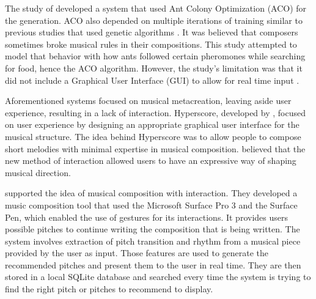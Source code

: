 The study of \cite{geis2008creating} developed a system that used Ant Colony Optimization (ACO) for the generation. ACO also depended on multiple iterations of training similar to previous studies that used genetic algorithms \citep{tokui2000music,kikuchi2016music}. It was believed that composers sometimes broke musical rules in their compositions. This study attempted to model that behavior with how ants followed certain pheromones while searching for food, hence the ACO algorithm. However, the study's limitation was that it did not include a Graphical User Interface (GUI) to allow for real time input \citep{geis2008creating}.


Aforementioned systems focused on musical metacreation, leaving aside user experience, resulting in a lack of interaction. Hyperscore, developed by \citet{farbood2004hyperscore}, focused on user experience by designing an appropriate graphical user interface for the musical structure. The idea behind Hyperscore was to allow people to compose short melodies with minimal expertise in musical composition.  \citeauthor{farbood2004hyperscore} believed that the new method of interaction allowed users to have an expressive way of shaping musical direction.

\citet{kikuchi2016music} supported the idea of musical composition with interaction. They developed a music composition tool that used the Microsoft Surface Pro 3 and the Surface Pen, which enabled the use of gestures for its interactions. It provides users possible pitches to continue writing the composition that is being written. The system involves extraction of pitch transition and rhythm from a musical piece provided by the user as input. Those features are used to generate the recommended pitches and present them to the user in real time. They are then stored in a local SQLite database and searched every time the system is trying to find the right pitch or pitches to recommend to display.

